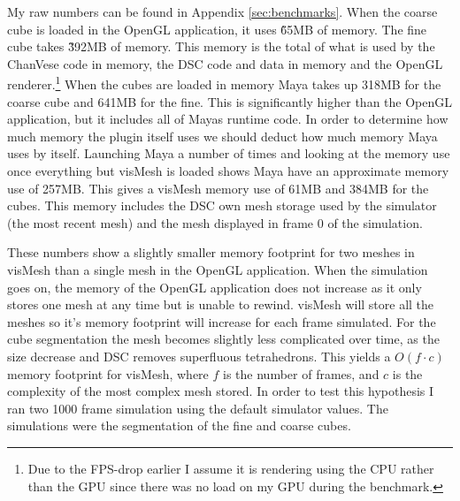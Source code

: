 My raw numbers can be found in Appendix
\ref{sec:benchmarks}. When the coarse cube is loaded in the OpenGL application,
it uses \~65MB of memory. The fine cube takes \~392MB of memory. This memory is
the total of what is used by the ChanVese code in memory, the DSC code and data
in memory and the OpenGL renderer.\footnote{Due to the FPS-drop earlier I assume
it is rendering using the CPU rather than the GPU since there was no load on my
GPU during the benchmark.} When the cubes are loaded in memory Maya takes up
318MB for the coarse cube and 641MB for the fine. This is significantly higher
than the OpenGL application, but it includes all of Mayas runtime code. In order
to determine how much memory the plugin itself uses we should deduct how much
memory Maya uses by itself. Launching Maya a number of times and looking at the
memory use once everything but visMesh is loaded shows Maya have an approximate
memory use of 257MB. This gives a visMesh memory use of 61MB and 384MB for the
cubes. This memory includes the DSC own mesh storage used by the simulator (the
most recent mesh) and the mesh displayed in frame 0 of the simulation.

These numbers show a slightly smaller memory footprint for two meshes in visMesh
than a single mesh in the OpenGL application. When the simulation goes on, the
memory of the OpenGL application does not increase as it only stores one mesh at
any time but is unable to rewind. visMesh will store all the meshes so it's
memory footprint will increase for each frame simulated. For the cube
segmentation the mesh becomes slightly less complicated over time, as the size
decrease and DSC removes superfluous tetrahedrons. This yields a $O(f\cdot c)$
memory footprint for visMesh, where $f$ is the number of frames, and $c$ is the
complexity of the most complex mesh stored. In order to test this hypothesis I
ran two 1000 frame simulation using the default simulator values. The
simulations were the segmentation of the fine and coarse cubes.

